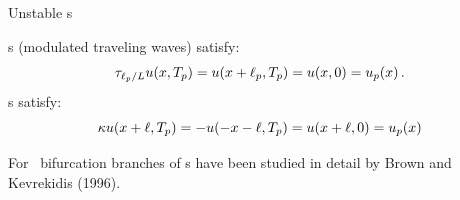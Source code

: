 \documentclass{beamer}
\begin{document}


\begin{frame}{Unstable \rpo s}


\Rpo s (modulated traveling waves) satisfy:
\[
  \tau_{\ell_p/L}u(x,{T_{p}}) =
  u(x+\ell_p,{T_{p}}) = u(x,0) = u_p(x)\,.
\]
\Po s satisfy:
\[
   \kappa u(x+\ell,{T_{p}}) =
  -u(-x-\ell,{T_{p}}) = u(x+\ell,0) = u_p(x)
\]

For \KSe\ bifurcation branches of \rpo s have been studied in detail by Brown and Kevrekidis (1996).

\end{frame}
\end{document}
